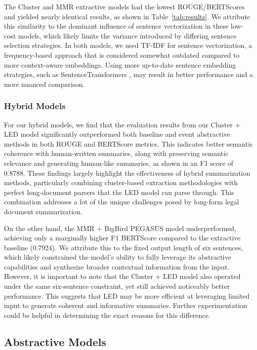 \documentclass[11pt]{article}
\begin{document}
The Cluster and MMR extractive models had the lowest ROUGE/BERTScores and yielded nearly identical results, as shown in Table~\ref{tab:results}. We attribute this similarity to the dominant influence of sentence vectorization in these low-cost models, which likely limits the variance introduced by differing sentence selection strategies. In both models, we used TF-IDF for sentence vectorization, a frequency-based approach that is considered somewhat outdated compared to more context-aware embeddings. Using more up-to-date sentence embedding strategies, such as SentenceTransformers \citep{reimers-2019-sentence-bert}, may result in better performance and a more nuanced comparison.

\subsubsection{Hybrid Models}

For our hybrid models, we find that the evaluation results from our Cluster + LED model significantly outperformed both baseline and event abstractive methods in both ROUGE and BERTScore metrics. This indicates better semantic coherence with human-written summaries, along with preserving semantic relevance and generating human-like summaries, as shown in an F1 score of 0.8788. These findings largely highlight the effectiveness of hybrid summarization methods, particularly combining cluster-based extraction methodologies with perfect long-document parsers that the LED model can parse through. This combination addresses a lot of the unique challenges posed by long-form legal document summarization.

On the other hand, the MMR + BigBird PEGASUS model underperformed, achieving only a marginally higher F1 BERTScore compared to the extractive baseline (0.7924). We attribute this to the fixed output length of six sentences, which likely constrained the model’s ability to fully leverage its abstractive capabilities and synthesize broader contextual information from the input. However, it is important to note that the Cluster + LED model also operated under the same six-sentence constraint, yet still achieved noticeably better performance. This suggests that LED may be more efficient at leveraging limited input to generate coherent and informative summaries. Further experimentation could be helpful in determining the exact reasons for this difference.

\subsection{Abstractive Models}
\end{document}
